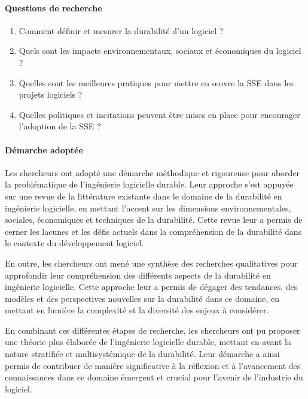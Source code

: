 \paragraph{Questions de recherche}
\begin{enumerate}
    \item Comment définir et mesurer la durabilité d'un logiciel ?
    \item Quels sont les impacts environnementaux, sociaux et économiques du logiciel ?
    \item Quelles sont les meilleures pratiques pour mettre en œuvre la SSE dans les projets logiciels ?
    \item Quelles politiques et incitations peuvent être mises en place pour encourager l'adoption de la SSE ?
\end{enumerate}

\paragraph{Démarche adoptée}
Les chercheurs ont adopté une démarche méthodique et rigoureuse pour aborder la problématique de l'ingénierie logicielle durable. Leur approche s'est appuyée sur une revue de la littérature existante dans le domaine de la durabilité en ingénierie logicielle, en mettant l'accent sur les dimensions environnementales, sociales, économiques et techniques de la durabilité. Cette revue leur a permis de cerner les lacunes et les défis actuels dans la compréhension de la durabilité dans le contexte du développement logiciel.

En outre, les chercheurs ont mené une synthèse des recherches qualitatives pour approfondir leur compréhension des différents aspects de la durabilité en ingénierie logicielle. Cette approche leur a permis de dégager des tendances, des modèles et des perspectives nouvelles sur la durabilité dans ce domaine, en mettant en lumière la complexité et la diversité des enjeux à considérer.

En combinant ces différentes étapes de recherche, les chercheurs ont pu proposer une théorie plus élaborée de l'ingénierie logicielle durable, mettant en avant la nature stratifiée et multisystémique de la durabilité. Leur démarche a ainsi permis de contribuer de manière significative à la réflexion et à l'avancement des connaissances dans ce domaine émergent et crucial pour l'avenir de l'industrie du logiciel.


